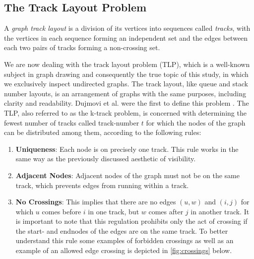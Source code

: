 \documentclass[bachelor, english]{algothesis}
\begin{document}
\subsection{The Track Layout Problem}
    \label{chap:track}
\begin{definition}
    A \emph{graph track layout} is a division of its vertices into sequences called \emph{tracks}, with the vertices in each sequence forming an independent set and the edges between each two pairs of tracks forming a non-crossing set.
\end{definition}
\noindent
We are now dealing with the track layout problem (TLP), which is a well-known subject in graph drawing and consequently the true topic of this study, in which we exclusively inspect undirected graphs. The track layout, like queue and stack number layouts, is an arrangement of graphs with the same purposes, including clarity and readability. Dujmovi et al. were the first to define this problem \cite{track_layout}. The TLP, also referred to as the k-track problem, is concerned with determining the fewest number of tracks called track-number $t$ for which the nodes of the graph can be distributed among them, according to the following rules:
\begin{enumerate}
    \item \textbf{Uniqueness}: Each node is on precisely one track.
    This rule works in the same way as the previously discussed aesthetic of visibility.
    \item \textbf{Adjacent Nodes}: Adjacent nodes of the graph must not be on the same track, which prevents edges from running within a track.
    \item \textbf{No Crossings}: This implies that there are no edges $(u,w)$ and $(i,j)$ for which $u$ comes before $i$ in one track, but $w$ comes after $j$ in another track. It is important to note that this regulation prohibits only the act of crossing if the start- and endnodes of the edges are on the same track. To better understand this rule some examples of forbidden crossings as well as an example of an allowed edge crossing is depicted in \cref{fig:crossings} below.
\end{enumerate}
\end{document}
